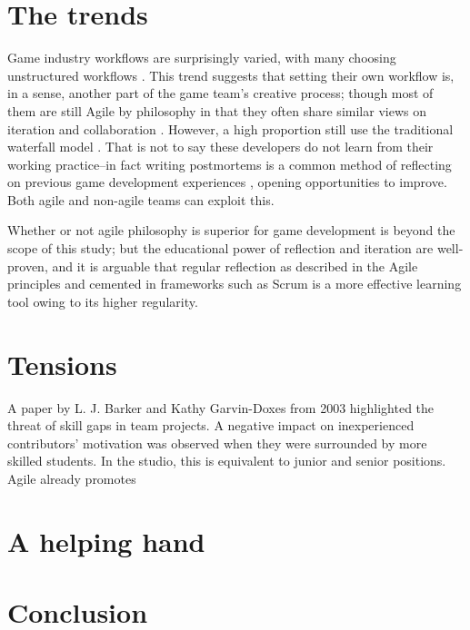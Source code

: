 \documentclass{scrartcl}
\begin{document}
\section{The trends}
Game industry workflows are surprisingly varied, with many choosing unstructured workflows \cite{devstudy}. This trend suggests that setting their own workflow is, in a sense, another part of the game team's creative process; though most of them are still Agile by philosophy in that they often share similar views on iteration \cite{iteration} and collaboration \cite{collaboration}. However, a high proportion still use the traditional waterfall model \cite{devstudy,olddays}. That is not to say these developers do not learn from their working practice--in fact writing postmortems is a common method of reflecting on previous game development experiences \cite{problems}, opening opportunities to improve. Both agile and non-agile teams can exploit this.

Whether or not agile philosophy is superior for game development is beyond the scope of this study; but the educational power of reflection \cite{reflection} and iteration \cite{iteration, collaboration} are well-proven, and it is arguable that regular reflection as described in the Agile principles \cite{principles} and cemented in frameworks such as Scrum \cite{scrum} is a more effective learning tool owing to its higher regularity.

\section{Tensions}
A paper by L. J. Barker and Kathy Garvin-Doxes from 2003\cite{group2003} highlighted the threat of skill gaps in team projects. A negative impact on inexperienced contributors' motivation was observed when they were surrounded by more skilled students. In the studio, this is equivalent to junior and senior positions. Agile already promotes 

\section{A helping hand}

\section{Conclusion}

 

\end{document}
